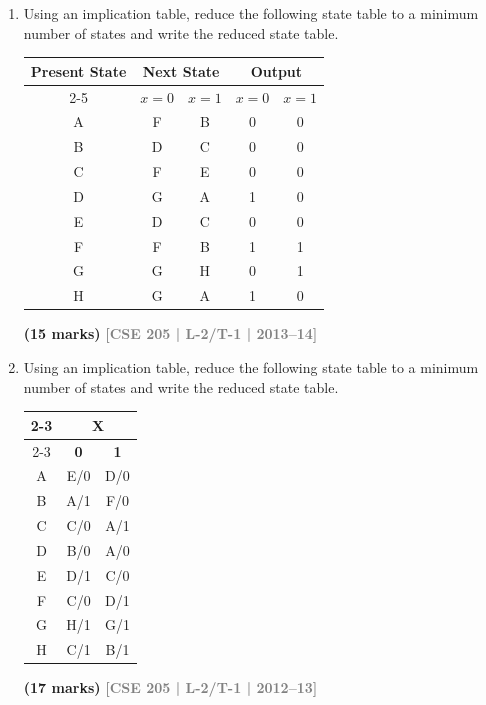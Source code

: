 \documentclass[12pt]{article}
\newcommand{\yr}[1]{\hfill\textcolor{gray}{\small\textbf{[#1]}}}
\newcommand{\mk}[1]{\textcolor{orange!70!black}{\small\textbf{(#1 marks)}}}
\begin{document}
\begin{enumerate}
\mk{10} \yr{CSE 205 | L-2/T-1 | 2014--15}

\item Using an implication table, reduce the following state table to a minimum number of states and write the reduced state table.

\begin{center}
\renewcommand{\arraystretch}{1.3}
  \begin{tabular}{|c|c|c|c|c|}
        \hline
        \multirow{2}{*}{Present State} & \multicolumn{2}{c|}{Next State} & \multicolumn{2}{c|}{Output} \\
        \cline{2-5}
         & $x = 0$ & $x = 1$ & $x = 0$ & $x = 1$ \\
        \hline
        A & F & B & 0 & 0 \\
        \hline
        B & D & C & 0 & 0 \\
        \hline
        C & F & E & 0 & 0 \\
        \hline
        D & G & A & 1 & 0 \\
        \hline
        E & D & C & 0 & 0 \\
        \hline
        F & F & B & 1 & 1 \\
        \hline
        G & G & H & 0 & 1 \\
        \hline
        H & G & A & 1 & 0 \\
        \hline
    \end{tabular}
\end{center}
\mk{15} \yr{CSE 205 | L-2/T-1 | 2013--14}

\item Using an implication table, reduce the following state table to a minimum number of states and write the reduced state table.

\begin{center}
  \renewcommand{\arraystretch}{1.3}  
  \begin{tabular}{|c|c|c|}
        \cline{2-3}
        \multicolumn{1}{c|}{} & \multicolumn{2}{c|}{\textbf{X}} \\
        \cline{2-3}
        \multicolumn{1}{c|}{} & \textbf{0} & \textbf{1} \\
        \hline
        A & E/0 & D/0 \\
        \hline
        B & A/1 & F/0 \\
        \hline
        C & C/0 & A/1 \\
        \hline
        D & B/0 & A/0 \\
        \hline
        E & D/1 & C/0 \\
        \hline
        F & C/0 & D/1 \\
        \hline
        G & H/1 & G/1 \\
        \hline
        H & C/1 & B/1 \\
        \hline
    \end{tabular}
\end{center}
\mk{17} \yr{CSE 205 | L-2/T-1 | 2012--13}

\end{enumerate}
\end{document}
